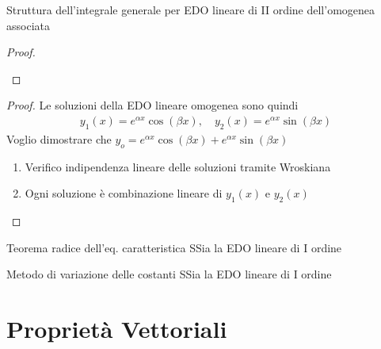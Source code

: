 \documentclass{article}  %
\begin{document}
\begin{theorem}{Struttura dell'integrale generale per EDO lineare di II ordine dell'omogenea associata}
\begin{enumerate}
\begin{proof}
\begin{enumerate}
			\end{enumerate}
		\end{proof}
		\begin{proof}
			\fbox{\textcolor{red}{Caso 3: $\Delta < 0$}}
			Le soluzioni della EDO lineare omogenea sono quindi
			\begin{align*}
				y_1(x) = e^{\alpha x} \cos(\beta x), \quad y_2(x) = e^{\alpha x} \sin(\beta x)
			\end{align*}
			Voglio dimostrare che $y_o= e^{\alpha x} \cos(\beta x) + e^{\alpha x} \sin(\beta x)$
			\begin{enumerate}
				\item Verifico indipendenza lineare delle soluzioni tramite Wroskiana
				\item Ogni soluzione è combinazione lineare di $y_1(x)$ e $y_2(x)$
			\end{enumerate}
		\end{proof}
	\end{enumerate}
\end{theorem}
\begin{theorem}{Teorema radice dell'eq. caratteristica}
	SSia la EDO lineare di I ordine
\end{theorem}
\begin{theorem}{Metodo di variazione delle costanti}
	SSia la EDO lineare di I ordine
\end{theorem}

\newpage
\section{Proprietà Vettoriali}
\end{document}

